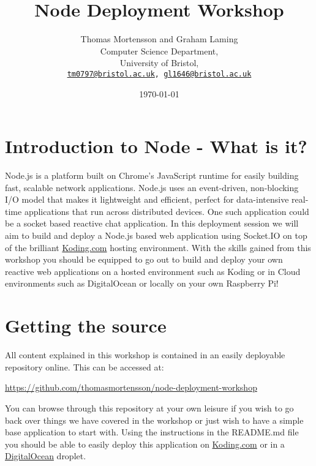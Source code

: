 \documentclass[twocolumn]{article}
\begin{document}
\lstset{style=Style1}

\title{Node Deployment Workshop} 
\author{Thomas Mortensson and Graham Laming\\
        	Computer Science Department,\\
		University of Bristol,\\
		\texttt{\href{mailto:tm0797@bristol.ac.uk}{tm0797@bristol.ac.uk}, \href{mailto:gl1646@bristol.ac.uk}{gl1646@bristol.ac.uk}} 
		}
\date{\today} 
\maketitle

\section{Introduction to Node - What is it?}

Node.js is a platform built on Chrome's JavaScript runtime for easily building fast, scalable network applications. Node.js uses an event-driven, non-blocking I/O model that makes it lightweight and efficient, perfect for data-intensive real-time applications that run across distributed devices. One such application could be a socket based reactive chat application. In this deployment session we will aim to build and deploy a Node.js based web application using Socket.IO on top of the brilliant \href{http://koding.com}{Koding.com} hosting environment. With the skills gained from this workshop you should be equipped to go out to build and deploy your own reactive web applications on a hosted environment such as Koding or in Cloud environments such as DigitalOcean or locally on your own Raspberry Pi!

\section {Getting the source}

All content explained in this workshop is contained in an easily deployable repository online. This can be accessed at:
{\begin{center}
\url{https://github.com/thomasmortensson/node-deployment-workshop}\\
\end{center}
}

You can browse through this repository at your own leisure if you wish to go back over things we have covered in the workshop or just wish to have a simple base application to start with. Using the instructions in the README.md file you should be able to easily deploy this application on \href{http://koding.com}{Koding.com} or in a \href{http://digitalocean.com}{DigitalOcean} droplet.
\end{document}
